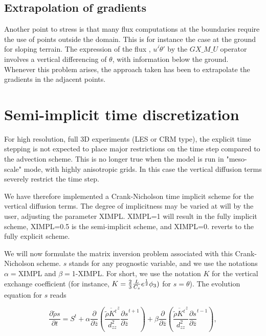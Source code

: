 \subsection{Extrapolation of gradients}

Another point to stress is that many flux computations at the boundaries
require the use of points outside the domain. This is for instance the
case at the ground for sloping terrain. The expression of the flux ,
$\overline{u'\theta'}$ by the $GX\_M\_U$ operator involves a vertical
differencing of $\theta$, with information below the ground. Whenever
this problem arises, the approach taken has been to extrapolate the
gradients in the adjacent points.

\section{Semi-implicit time discretization}

For high resolution, full 3D experiments (LES or CRM type), the
explicit time stepping is not expected to place major restrictions on the
time step compared to the advection scheme. This is no longer true when
the model is run in "meso-scale" mode, with highly anisotropic grids. In this
case the vertical diffusion terms severely restrict the time step.

We have therefore implemented a Crank-Nicholson time implicit scheme for the
vertical diffusion terms. The degree of implicitness may be varied at will
by the user, adjusting the parameter XIMPL. XIMPL=1 will result in the
fully implicit scheme, XIMPL=0.5 is the semi-implicit scheme, and XIMPL=0.
reverts to the fully explicit scheme.

We will now formulate the matrix inversion problem associated with this
Crank-Nicholson scheme. $s$ stands for any prognostic variable, and we use
the notations $\alpha=$XIMPL and $\beta=$1-XIMPL.
For short, we use the notation $K$ for the vertical
exchange coefficient (for instance, $K= {2 \over 3} {L \over C_s}
e^{1 \over 2} \phi_3)$ for $s=\theta$).
The evolution equation for $s$ reads

\begin{equation}
\frac{\partial \tilde{\rho} s}{\partial t}= S^t +\alpha
\frac{\partial}{\partial \overline{z}}
(\frac {\overline{\tilde{\rho} {K}^t}^z}{d_{zz}^2}
{\frac{\partial s}{\partial \overline{z}}}^{t+1})+ \beta
\frac{\partial}{\partial \overline{z}}
(\frac {\overline{\tilde{\rho} {K}^t}^z}{d_{zz}^2}
{\frac{\partial s}{\partial \overline{z}}}^{t-1}),
\end{equation}

